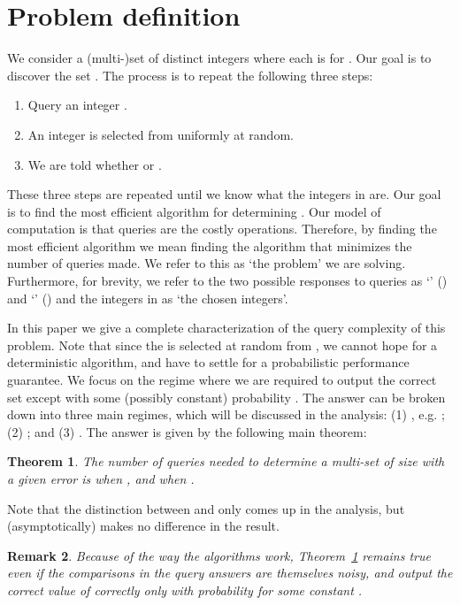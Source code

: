 \documentclass[12pt]{article}
\newtheorem{theorem}{Theorem}
\newtheorem{remark}[theorem]{Remark}
\begin{document}
\section{Problem definition} \label{sec:description}
We consider a (multi-)set  of  distinct integers where each is  for . Our goal is to discover the set . The process is to repeat the following three steps: 
\begin{enumerate}
	\item Query an integer .
	\item An integer  is selected from  uniformly at random.
	\item We are told whether  or .
\end{enumerate}
These three steps are repeated until we know what the  integers in  are. Our goal is to find the most efficient algorithm for determining . Our model of computation is that queries are the costly operations. Therefore, by finding the most efficient algorithm we mean finding the algorithm that minimizes the number of queries made. We refer to this as `the problem' we are solving. Furthermore, for brevity, we refer to the two possible responses to queries as `' () and `' () and the  integers in  as `the chosen integers'. 

In this paper we give a complete characterization of the query complexity of this problem. 
Note that since the  is selected at random from , we cannot hope for a deterministic algorithm, and have to settle for a probabilistic performance guarantee. 
We focus on the regime where we are required to output the correct set  except with some (possibly constant) probability . 
The answer can be broken down into three main regimes, which will 
be discussed in the analysis: (1) , e.g. ; (2) ; and (3) . 
The answer is given by the following main theorem:

\begin{theorem}
\label{thm:main1}
The number of queries needed to determine a multi-set  of size  with a given error  is  when , and  when . 
\end{theorem}

Note that the distinction between  and  only comes up in the analysis, but (asymptotically) makes no difference in the result. 

\begin{remark}
Because of the way the algorithms work, Theorem~\ref{thm:main1} remains true even if the comparisons in the query answers are themselves noisy, 
and output the correct value of  correctly only with probability  for some constant . 
\end{remark}
\end{document}
